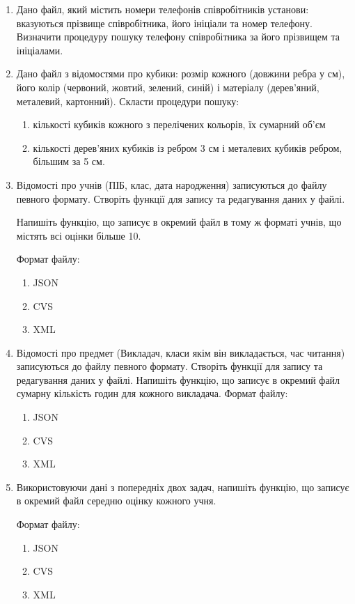\documentclass[]{article}
\makeatletter
\newcommand{\xslalph}[1]{\expandafter\@xslalph\csname c@#1\endcsname}
\newcommand{\@xslalph}[1]{%
    \ifcase#1\or а\or б\or в\or г\or д\or e\or є\or ж\or з\or i%
    \or й\or к\or л\or м\or н\or о\or п\or р\or с\or т%
    \or у\or ф\or х\or ц\or ч\or ш\or ю\or я\or аа\or бб\or вв %
    \else\@ctrerr\fi%
}
\makeatother
\begin{document}
\begin{enumerate}
\item
Дано файл, який містить номери телефонів співробітників установи:
вказуються прізвище співробітника, його ініціали та номер телефону.
Визначити процедуру пошуку телефону співробітника за його прізвищем та
ініціалами.
\item
Дано файл з відомостями про кубики: розмір кожного (довжини ребра у см),
його колір (червоний, жовтий, зелений, синій) і матеріалу (дерев'яний,
металевий, картонний). Скласти процедури пошуку:
\begin{enumerate}[label=\xslalph*)]
\item кількості кубиків кожного з перелічених кольорів, їх сумарний об'єм

\item кількості дерев'яних кубиків із ребром 3 см і металевих кубиків
ребром, більшим за 5 см.
\end{enumerate}

\item
Відомості про учнів (ПІБ, клас, дата народження) записуються до файлу
певного формату. Створіть функції для запису та редагування даних у
файлі.

Напишіть функцію, що записує в окремий файл в тому ж форматі учнів, що
містять всі оцінки більше 10.

Формат файлу:
\begin{enumerate}[label=\xslalph*)]
\item
JSON
\item
CVS
\item
XML
\end{enumerate}

\item
Відомості про предмет (Викладач, класи якім він викладається, час
читання) записуються до файлу певного формату. Створіть функції для
запису та редагування даних у файлі. Напишіть функцію, що записує в
окремий файл сумарну кількість годин для кожного викладача.
Формат файлу:
\begin{enumerate}[label=\xslalph*)]
\item
JSON
\item
CVS
\item
XML
\end{enumerate}

\item
Використовуючи дані з попередніх двох задач, напишіть функцію, що
записує в окремий файл середню оцінку кожного учня.

Формат файлу:
\begin{enumerate}[label=\xslalph*)]
\item
JSON
\item
CVS
\item
XML
\end{enumerate}


\end{enumerate}
\end{document}
